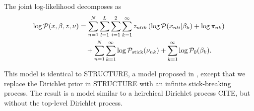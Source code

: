 \begin{ex}
The joint log-likelihood decomposes as
\begin{align*}
\log \mathcal{P}(x, \beta, z, \nu) &=
\sum_{n=1}^N \sum_{l=1}^L \sum_{i = 1}^2 \sum_{k=1}^{\infty}
        z_{nlik} \left(
            \log \mathcal{P}(x_{nli} \vert \beta_{k}) + \log \pi_{nk}
        \right)
\nonumber\\&
    \quad +
    \sum_{n=1}^N \sum_{k=1}^{\infty} \log \mathcal{P}_{\mathrm{stick}}(\nu_{nk})
    + \sum_{k=1}^{\infty} \log \mathcal{P}_{0}(\beta_{k}).
\end{align*}
\end{ex}

This model is identical to STRUCTURE,
a model proposed in \citet{pritchard:2000:structure, raj:2014:faststructure},
except that we replace the Dirichlet prior in STRUCTURE
with an infinite stick-breaking process.
The result is a model similar to a heirchical Dirichlet process CITE,
but without the top-level Dirichlet process.


